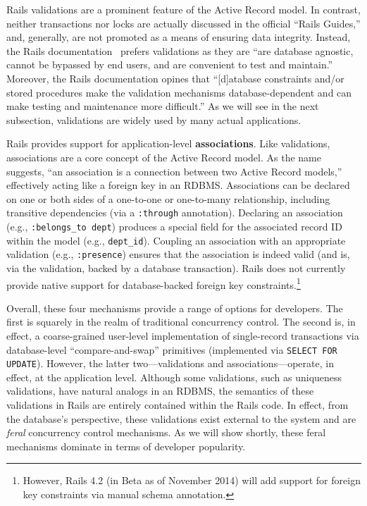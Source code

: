 \begin{myenumerate}
  Rails validations are a prominent feature of the Active Record
  model. In contrast, neither transactions nor locks are actually
  discussed in the official ``Rails Guides,'' and, generally, are not
  promoted as a means of ensuring data integrity. Instead, the Rails
  documentation~\cite{rails-guide} prefers validations as they are
  ``are database agnostic, cannot be bypassed by end users, and are
  convenient to test and maintain.'' Moreover, the Rails documentation
  opines that ``[d]atabase constraints and/or stored procedures make
  the validation mechanisms database-dependent and can make testing
  and maintenance more difficult.'' As we will see in the next
  subsection, validations are widely used by many actual applications.

\item Rails provides support for application-level
  \textbf{associations}. Like validations, associations are a core
  concept of the Active Record model. As the name suggests, ``an
  association is a connection between two Active Record models,''
  effectively acting like a foreign key in an RDBMS. Associations can be declared on one or both sides of a
  one-to-one or one-to-many relationship, including transitive
  dependencies (via a \texttt{:through} annotation). Declaring an
  association (e.g., \texttt{:belongs\_to dept}) produces a special
  field for the associated record ID within the model (e.g.,
  \texttt{dept\_id}). Coupling an association with an appropriate
  validation (e.g., \texttt{:presence}) ensures that the association
  is indeed valid (and is, via the validation, backed by a database
  transaction). Rails does not currently provide native support for
  database-backed foreign key constraints.\footnote{However, Rails 4.2
    (in Beta as of November 2014) will add support for foreign key
    constraints via manual schema annotation.}
\end{myenumerate}

Overall, these four mechanisms provide a range of options for
developers. The first is squarely in the realm of traditional
concurrency control. The second is, in effect, a coarse-grained
user-level implementation of single-record transactions via
database-level ``compare-and-swap'' primitives (implemented via
\texttt{SELECT FOR UPDATE}). However, the latter two---validations and
associations---operate, in effect, at the application level. Although
some validations, such as uniqueness validations, have natural analogs
in an RDBMS, the semantics of these validations in Rails are entirely
contained within the Rails code. In effect, from the database's
perspective, these validations exist external to the system and are
\textit{feral} concurrency control mechanisms. As we will show
shortly, these feral mechanisms dominate in terms of developer
popularity.

